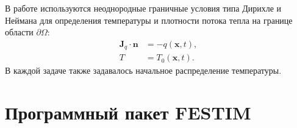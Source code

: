 В работе используются неоднородные граничные условия типа Дирихле и Неймана для определения температуры и плотности потока тепла на границе области \( \partial \Omega \):
\begin{subequations}
    \begin{align}
        \mathbf{J}_q \cdot \mathbf{n} & = -q(\mathbf{x}, t) \label{eq:ch2/heat_bc_Neumann},   \\
        T                             & = T_0(\mathbf{x},t) \label{eq:ch2/heat_bc_Dirichlet}.
    \end{align}
\end{subequations}
В каждой задаче также задавалось начальное распределение температуры.

\section{Программный пакет FESTIM}\label{sec:ch2/sec2}

